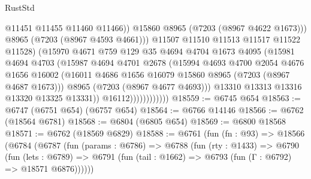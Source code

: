 \begin{lexlean}{RustStd}
\begin{coremodule}
                                    @11451
                                    @11455
                                    @11460
                                    @11466))
                                @15860
                                @8965
                                (@7203 (@8967 @4622 @1673)))
                              @8965
                              (@7203 (@8967 @4593 @4661)))
                            @11507
                            @11510
                            @11513
                            @11517
                            @11522
                            @11528)
                          (@15970
                            @4671
                            @759
                            @129
                            @35
                            @4694
                            @4704
                            @1673
                            @4095
                            (@15981
                              @4694
                              @4703
                              (@15987
                                @4694
                                @4701
                                @2678
                                (@15994
                                  @4693
                                  @4700
                                  @2054
                                  @4676
                                  @1656
                                  @16002
                                  (@16011
                                    @4686
                                    @1656
                                    @16079
                                    @15860
                                    @8965
                                    (@7203 (@8967 @4687 @1673)))
                                  @8965
                                  (@7203 (@8967 @4677 @4693)))
                                @13310
                                @13313
                                @13316
                                @13320
                                @13325
                                @13331))
                            @16112))))))))))))
@18559 := @6745 @654
@18563 := @6747 (@6751 @654) (@6757 @654)
@18564 := @6766 @14146
@18566 := @6762 (@18564 @6781)
@18568 := @6804 (@6805 @654)
@18569 := @6800 @18568
@18571 := @6762 (@18569 @6829)
@18588 := @6761
    (fun (fn : @93) =>
    @18566
      (@6784
        (@6787
          (fun (params : @6786) =>
          @6788
            (fun (rty : @1433) =>
            @6790
              (fun (lets : @6789) =>
              @6791 (fun (tail : @1662) => @6793 (fun (Γ : @6792) => @18571 @6876))))))

\end{coremodule}
\end{lexlean}

